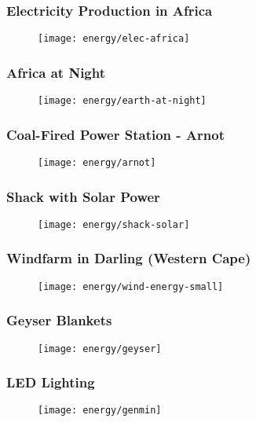 \documentclass{beamer}
\begin{document}
\begin{frame}
  \frametitle{Electricity Production in Africa}
  \begin{figure}
  \centering
  \texttt{[image: energy/elec-africa]}
  \end{figure}
\end{frame}

\begin{frame}
\frametitle{Africa at Night}
  \begin{figure}
  \centering
  \texttt{[image: energy/earth-at-night]}
  \end{figure}  
\end{frame}

\begin{frame}
  \frametitle{Coal-Fired Power Station - Arnot}
  \begin{figure}
  \centering
  \texttt{[image: energy/arnot]}
  \end{figure}
\end{frame}

\begin{frame}
  \frametitle{Shack with Solar Power}
  \begin{figure}
  \centering
  \texttt{[image: energy/shack-solar]}
  \end{figure}
\end{frame}

\begin{frame}
  \frametitle{Windfarm in Darling (Western Cape)}
  \begin{figure}
  \centering
  \texttt{[image: energy/wind-energy-small]}
  \end{figure}
\end{frame}

\begin{frame}
  \frametitle{Geyser Blankets}
  \begin{figure}
  \centering
  \texttt{[image: energy/geyser]}
  \end{figure}
\end{frame}

\begin{frame}
  \frametitle{LED Lighting}
  \begin{figure}
  \centering
  \texttt{[image: energy/genmin]}
  \end{figure}
\end{frame}
\end{document}
